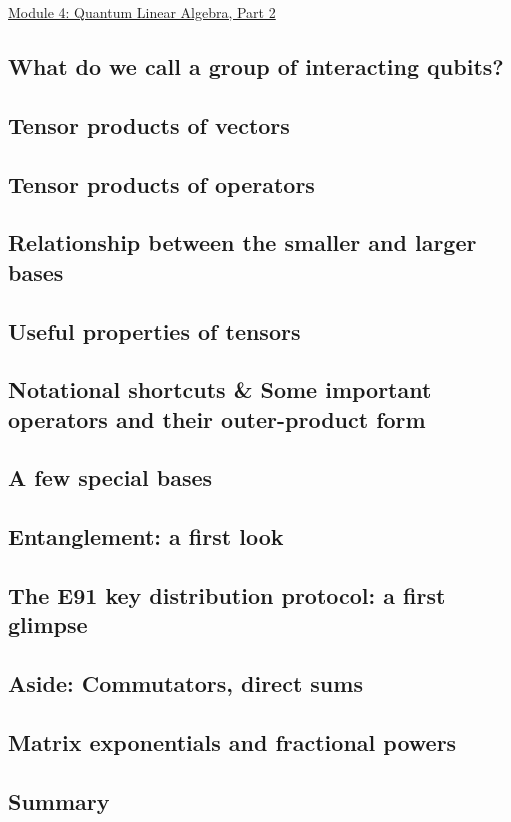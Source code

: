 \documentclass[main.tex]{subfiles}
\begin{document}
\href{https://www2.seas.gwu.edu/~simhaweb/quantum/modules/module4/module4.html}{Module 4: Quantum Linear Algebra, Part 2}

\subsection{What do we call a group of interacting qubits?}

\subsection{Tensor products of vectors}

\subsection{Tensor products of operators}

\subsection{Relationship between the smaller and larger bases}

\subsection{Useful properties of tensors}

\subsection{Notational shortcuts \& Some important operators and their outer-product form}

\subsection{A few special bases}

\subsection{Entanglement: a first look}

\subsection{The E91 key distribution protocol: a first glimpse}

\subsection{Aside: Commutators, direct sums}

\subsection{Matrix exponentials and fractional powers}

\subsection{Summary}
\end{document}

